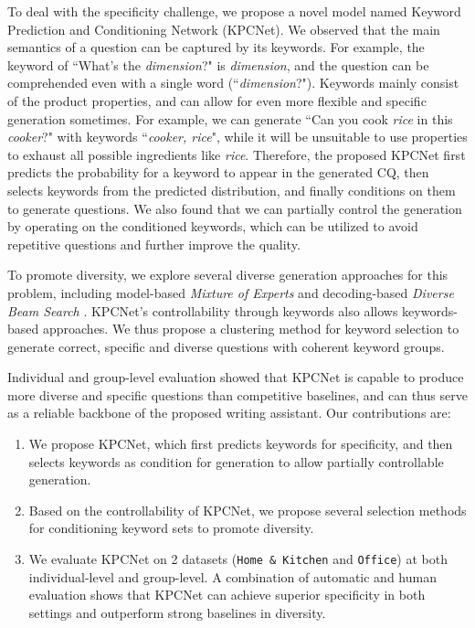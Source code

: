 To deal with the specificity challenge, we propose a novel model named Keyword Prediction and Conditioning Network (KPCNet). We observed that the main semantics of a question can be captured by its keywords. For example, the keyword of ``What's the \textit{dimension}?" is \textit{dimension}, and the question can be comprehended even with a single word (``\textit{dimension}?"). Keywords mainly consist of the product properties, and can allow for even more flexible and specific generation sometimes. For example, we can generate ``Can you cook \textit{rice} in this \textit{cooker}?" with keywords ``\textit{cooker, rice}", while it will be unsuitable to use properties to exhaust all possible ingredients like \textit{rice}. Therefore, the proposed KPCNet first predicts the probability for a keyword to appear in the generated CQ, then selects keywords from the predicted distribution, and finally conditions on them to generate questions. We also found that we can partially control the generation by operating on the conditioned keywords, which can be utilized to avoid repetitive questions and further improve the quality.

To promote diversity, we explore several diverse generation approaches for this problem, including model-based \textit{Mixture of Experts} \citep{shen2019mixture} and decoding-based \textit{Diverse Beam Search} \citep{vijayakumar2018diverse}. KPCNet's controllability through keywords also allows keywords-based approaches. We thus propose a clustering method for keyword selection to generate correct, specific and diverse questions with coherent keyword groups.


Individual and group-level evaluation showed that KPCNet is capable to produce more diverse and specific questions than competitive baselines, and can thus serve as a reliable backbone of the proposed writing assistant. Our contributions are:

\begin{enumerate}
  \item We propose KPCNet, which first predicts keywords for specificity, and then selects keywords as condition for generation to allow partially controllable generation.
  \item Based on the controllability of KPCNet, we propose several selection methods for conditioning keyword sets to promote diversity.
  \item We evaluate KPCNet on 2 datasets (\texttt{Home \& Kitchen} and \texttt{Office}) at both individual-level and group-level. A combination of automatic and human evaluation shows that KPCNet can achieve superior specificity in both settings and outperform strong baselines in diversity.
\end{enumerate}
